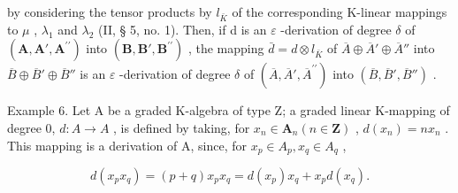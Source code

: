 by considering the tensor products by \(l_{\bar{K}}\) of the corresponding K-linear mappings to \(\mu\) , \(\lambda_{1}\) and \(\lambda_{2}\) (II, § 5, no. 1). Then, if d is an \(\varepsilon\) -derivation of degree \(\delta\) of \((\mathbf{A}, \mathbf{A}', \mathbf{A}^{\prime\prime})\) into \((\mathbf{B}, \mathbf{B}', \mathbf{B}^{\prime\prime})\) , the mapping \(\bar{d} = d \otimes l_{\bar{K}}\) of \(\overline{A} \oplus \overline{A}' \oplus \overline{A}''\) into \(\overline{B} \oplus \overline{B}' \oplus \overline{B}''\) is an \(\varepsilon\) -derivation of degree \(\delta\) of \((\overline{A}, \overline{A}', \overline{A}^{\prime\prime})\) into \((\overline{B}, \overline{B}', \overline{B}'' )\) .

Example 6. Let A be a graded K-algebra of type Z; a graded linear K-mapping of degree 0, \(d: A \to A\) , is defined by taking, for \(x_{n} \in \mathbf{A}_{n}(n \in \mathbf{Z})\) , \(d(x_{n}) = nx_{n}\) . This mapping is a derivation of A, since, for \(x_{p} \in A_{p}, x_{q} \in A_{q}\) ,

\[
d (x _ {p} x _ {q}) = (p + q) x _ {p} x _ {q} = d (x _ {p}) x _ {q} + x _ {p} d (x _ {q}).
\]

